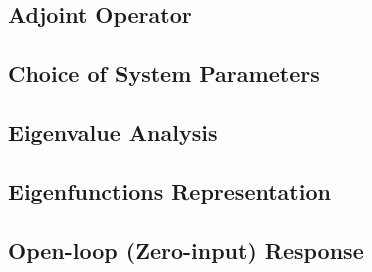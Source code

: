 \subsection{Adjoint Operator}

\subsection{Choice of System Parameters}

\subsection{Eigenvalue Analysis}

\subsection{Eigenfunctions Representation}

\subsection{Open-loop (Zero-input) Response}